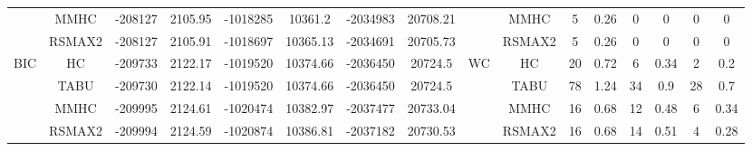 \begin{table}[p]
{\begin{tabular}{cc||cc|cc|cc||cc|cc|cc|cc}
& MMHC &	-208127 & 	2105.95 & 	-1018285 & 	10361.2 & 	-2034983 & 	20708.21 & 	& MMHC &	5 & 	0.26 & 	0 & 	0 & 	0 & 	0\tabularnewline													
& RSMAX2 &	-208127 & 	2105.91 & 	-1018697 & 	10365.13 & 	-2034691 & 	20705.73 & 	& RSMAX2 &	5 & 	0.26 & 	0 & 	0 & 	0 & 	0\tabularnewline													
\hline																										
\multirow{4}{*}{BIC} & HC &	-209733 & 	2122.17 & 	-1019520 & 	10374.66 & 	-2036450 & 	20724.5 & 	\multirow{4}{*}{WC} & HC &	20 & 	0.72 & 	6 & 	0.34 & 	2 & 	0.2\tabularnewline													
& TABU &	-209730 & 	2122.14 & 	-1019520 & 	10374.66 & 	-2036450 & 	20724.5 & 	& TABU &	78 & 	1.24 & 	34 & 	0.9 & 	28 & 	0.7\tabularnewline													
& MMHC &	-209995 & 	2124.61 & 	-1020474 & 	10382.97 & 	-2037477 & 	20733.04 & 	& MMHC &	16 & 	0.68 & 	12 & 	0.48 & 	6 & 	0.34\tabularnewline													
& RSMAX2 &	-209994 & 	2124.59 & 	-1020874 & 	10386.81 & 	-2037182 & 	20730.53 & 	& RSMAX2 &	16 & 	0.68 & 	14 & 	0.51 & 	4 & 	0.28\tabularnewline													
\hline																										
\end{tabular}																										
}																										
\end{table}																										



